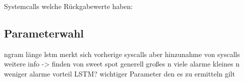             Systemcalls welche Rückgabewerte haben:
\subsection{Parameterwahl}
        ngram länge
        lstm merkt sich vorherige syscalls aber hinzunahme von syscalls weitere info
        -> finden von sweet spot
        generell großes n viele alarme
        kleines n weniger alarme  vorteil LSTM\@?
        wichtiger Parameter den es zu ermitteln gilt

